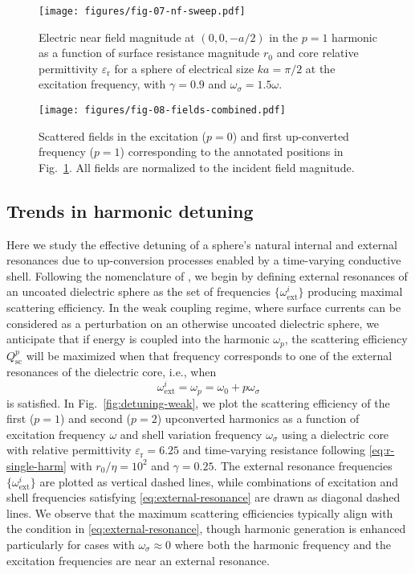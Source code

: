 \documentclass[article]{IEEEtran}
\newcommand{\T}[1]{\mathrm{#1}}
\begin{document}
\begin{figure}
    \centering
    \texttt{[image: figures/fig-07-nf-sweep.pdf]}
    \caption{Electric near field magnitude at $(0,0,-a/2)$ in the $p = 1$ harmonic as a function of surface resistance magnitude $r_0$ and core relative permittivity $\varepsilon_\T{r}$ for a sphere of electrical size $ka = \pi/2$ at the excitation frequency, with $\gamma = 0.9$ and $\omega_\sigma = 1.5\omega$.}
    \label{fig:nf-sweep}
\end{figure}

\begin{figure}
    \centering
    \texttt{[image: figures/fig-08-fields-combined.pdf]}
    \caption{Scattered fields in the excitation ($p=0$) and first up-converted frequency ($p=1$) corresponding to the annotated positions in Fig.~\ref{fig:nf-sweep}.  All fields are normalized to the incident field magnitude.}
    \label{fig:nf-fields}
\end{figure}

\subsection{Trends in harmonic detuning}

Here we study the effective detuning of a sphere's natural internal and external resonances due to up-conversion processes enabled by a time-varying conductive shell.  Following the nomenclature of \cite{stefanou2021light}, we begin by defining external resonances of an uncoated dielectric sphere as the set of frequencies $\{\omega_\T{ext}^i\}$ producing maximal scattering efficiency.  In the weak coupling regime, where surface currents can be considered as a perturbation on an otherwise uncoated dielectric sphere, we anticipate that if energy is coupled into the harmonic $\omega_p$, the scattering efficiency $Q_\T{sc}^p$ will be maximized when that frequency corresponds to one of the external resonances of the dielectric core, i.e., when
\begin{equation}
    \omega_\T{ext}^i = \omega_p = \omega_0 + p\omega_\sigma
    \label{eq:external-resonance}
\end{equation}
is satisfied.  In Fig.~\ref{fig:detuning-weak}, we plot the scattering efficiency of the first ($p=1$) and second ($p=2$) upconverted harmonics as a function of excitation frequency $\omega$ and shell variation frequency $\omega_\sigma$ using a dielectric core with relative permittivity $\varepsilon_\T{r}=6.25$ and time-varying resistance following \eqref{eq:r-single-harm} with $r_0/\eta = 10^2$ and $\gamma = 0.25$.  The external resonance frequencies $\{\omega_\T{ext}^i\}$ are plotted as vertical dashed lines, while combinations of excitation and shell frequencies satisfying \eqref{eq:external-resonance} are drawn as diagonal dashed lines.  We observe that the maximum scattering efficiencies typically align with the condition in \eqref{eq:external-resonance}, though harmonic generation is enhanced particularly for cases with $\omega_\sigma \approx 0$ where both the harmonic frequency and the excitation frequencies are near an external resonance. 
\end{document}
